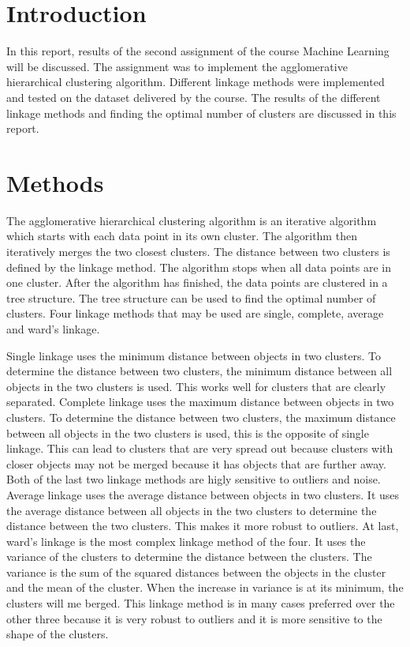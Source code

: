 \documentclass[twoside, a4paper, fleqn, reqno]{article}
\begin{document}
\maketitle

\section*{Introduction}
In this report, results of the second assignment of the course Machine Learning will be discussed.
The assignment was to implement the agglomerative hierarchical clustering algorithm.
Different linkage methods were implemented and tested on the dataset delivered by the course.
The results of the different linkage methods and finding the optimal number
of clusters are discussed in this report.

\section*{Methods}
The agglomerative hierarchical clustering algorithm is an iterative algorithm which
starts with each data point in its own cluster.
The algorithm then iteratively merges the two closest clusters.
The distance between two clusters is defined by the linkage method.
The algorithm stops when all data points are in one cluster.
After the algorithm has finished, the data points are clustered in a tree structure.
The tree structure can be used to find the optimal number of clusters.
Four linkage methods that may be used are single, complete, average and ward's linkage.
\par
Single linkage uses the minimum distance between objects in two clusters.
To determine the distance between two clusters, the minimum distance between
all objects in the two clusters is used. This works well for clusters that are
clearly separated.
Complete linkage uses the maximum distance between objects in two clusters.
To determine the distance between two clusters, the maximum distance between
all objects in the two clusters is used, this is the opposite of single linkage.
This can lead to clusters that are very spread out because clusters with closer
objects may not be merged because it has objects that are further away.
Both of the last two linkage methods are higly sensitive to outliers and noise.
Average linkage uses the average distance between objects in two clusters.
It uses the average distance between all objects in the two clusters to determine
the distance between the two clusters. This makes it more robust to outliers.
At last, ward's linkage is the most complex linkage method of the four.
It uses the variance of the clusters to determine the distance between the clusters.
The variance is the sum of the squared distances between the objects in the cluster
and the mean of the cluster. When the increase in variance is at its minimum,
the clusters will me berged. This linkage method is in many cases preferred over the other three
because it is very robust to outliers and it is more sensitive to the shape of the clusters.
\end{document}
